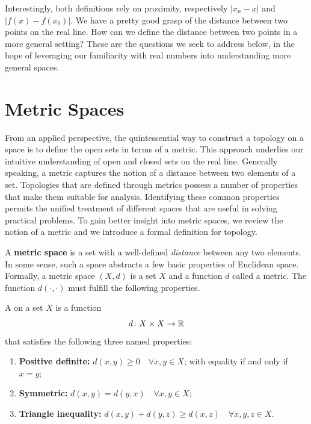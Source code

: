 Interestingly, both definitions rely on proximity, respectively $|x_n - x|$ and $|f(x) - f(x_0)|$.
We have a pretty good grasp of the distance between two points on the real line.
How can we define the distance between two points in a more general setting?
These are the questions we seek to address below, in the hope of leveraging our familiarity with real numbers into understanding more general spaces.


\section{Metric Spaces}

From an applied perspective, the quintessential way to construct a topology on a space is to define the open sets in terms of a metric.
This approach underlies our intuitive understanding of open and closed sets on the real line.
Generally speaking, a metric captures the notion of a distance between two elements of a set.
Topologies that are defined through metrics possess a number of properties that make them suitable for analysis.
Identifying these common properties permits the unified treatment of different spaces that are useful in solving practical problems.
To gain better insight into metric spaces, we review the notion of a metric and we introduce a formal definition for topology.

A \textbf{metric space} is a set with a well-defined \emph{distance} between any two elements.
In some sense, such a space abstracts a few basic properties of Euclidean space.
Formally, a metric space $(X,d)$ is a set $X$ and a function $d$ called a metric.
The function $d(\cdot, \cdot)$ must fulfill the following properties.

\begin{definition}
A  on a set $X$ is a function
\begin{equation*}
d \colon X \times X \rightarrow \mathbb{R}
\end{equation*}
that satisfies the following three named properties:
\begin{enumerate}
\item \textbf{Positive definite:} $d(x,y) \geq 0 \quad \forall x, y \in X$; with equality if and only if $x = y$;
\item \textbf{Symmetric:} $d(x,y) = d(y,x) \quad \forall x, y \in X$;
\item \textbf{Triangle inequality:} $d(x,y) + d(y,z) \geq d(x,z) \quad \forall x, y, z \in X$.
\end{enumerate}
\end{definition}


